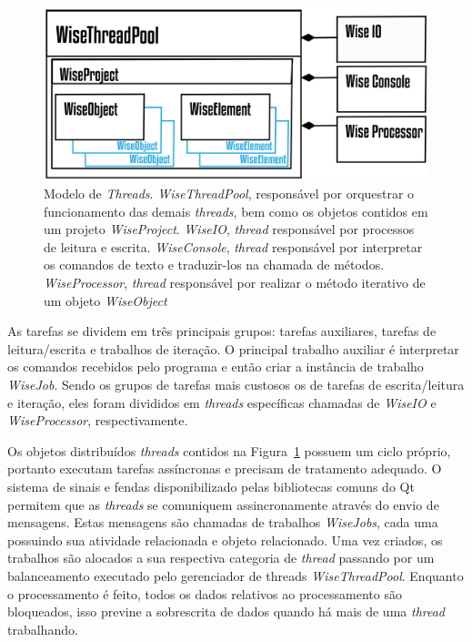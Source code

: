 \begin{figure}[!htbp]
	\centering
	\includegraphics[width=\linewidth]{Figures/WiseThreadPool@16x.png}
	\caption{Modelo de \textit{Threads}. \textit{WiseThreadPool}, responsável por orquestrar o funcionamento das demais \textit{threads}, bem como os objetos contidos em um projeto \textit{WiseProject}. \textit{WiseIO}, \textit{thread} responsável por processos de leitura e escrita. \textit{WiseConsole}, \textit{thread} responsável por interpretar os comandos de texto e traduzir-los na chamada de métodos. \textit{WiseProcessor}, \textit{thread} responsável por realizar o método iterativo de um objeto  \textit{WiseObject}}
	\label{fig7:threads}
\end{figure}

As tarefas se dividem em três principais grupos: tarefas auxiliares, tarefas de leitura/escrita e trabalhos de iteração. O principal trabalho auxiliar é interpretar os comandos recebidos pelo programa e então criar a instância de trabalho \textit{WiseJob}. Sendo os grupos de tarefas mais custosos os de tarefas de escrita/leitura e iteração, eles foram divididos em \textit{threads} específicas chamadas de \textit{WiseIO} e \textit{WiseProcessor}, respectivamente.

Os objetos distribuídos \textit{threads} contidos na Figura~\ref{fig7:threads} possuem um ciclo próprio, portanto executam tarefas assíncronas e precisam de tratamento adequado. O sistema de sinais e fendas disponibilizado pelas bibliotecas comuns do Qt permitem que as \textit{threads} se comuniquem assincronamente através do envio de mensagens. Estas mensagens são chamadas de trabalhos \textit{WiseJobs}, cada uma possuindo sua atividade relacionada e objeto relacionado. Uma vez criados, os trabalhos são alocados a sua respectiva categoria de \textit{thread} passando por um balanceamento executado pelo gerenciador de threads \textit{WiseThreadPool}. Enquanto o processamento é feito, todos os dados relativos ao processamento são bloqueados, isso previne a sobrescrita de dados quando há mais de uma \textit{thread} trabalhando.

